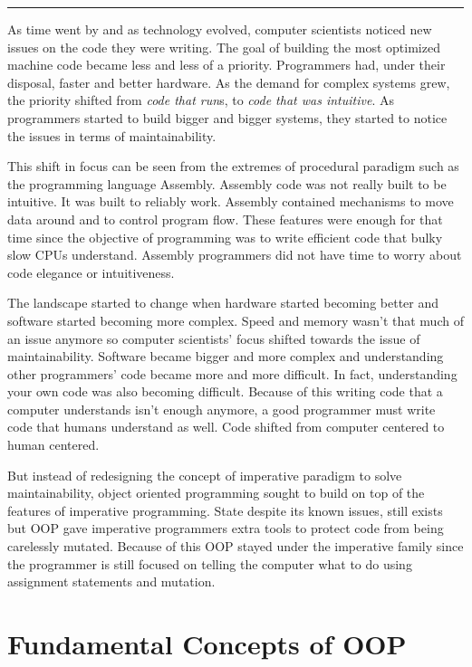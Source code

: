 \begin{center}\rule{0.5\linewidth}{0.5pt}\end{center}

As time went by and as technology evolved, computer scientists noticed
new issues on the code they were writing. The goal of building the most
optimized machine code became less and less of a priority. Programmers
had, under their disposal, faster and better hardware. As the demand for
complex systems grew, the priority shifted from \emph{code that run}s,
to \emph{code that was intuitive}. As programmers started to build
bigger and bigger systems, they started to notice the issues in terms of
maintainability.

This shift in focus can be seen from the extremes of procedural paradigm
such as the programming language Assembly. Assembly code was not really
built to be intuitive. It was built to reliably work. Assembly contained
mechanisms to move data around and to control program flow. These
features were enough for that time since the objective of programming
was to write efficient code that bulky slow CPUs understand. Assembly
programmers did not have time to worry about code elegance or
intuitiveness.

The landscape started to change when hardware started becoming better
and software started becoming more complex. Speed and memory wasn't that
much of an issue anymore so computer scientists' focus shifted towards
the issue of maintainability. Software became bigger and more complex
and understanding other programmers' code became more and more
difficult. In fact, understanding your own code was also becoming
difficult. Because of this writing code that a computer understands
isn't enough anymore, a good programmer must write code that humans
understand as well. Code shifted from computer centered to human
centered.

But instead of redesigning the concept of imperative paradigm to solve
maintainability, object oriented programming sought to build on top of
the features of imperative programming. State despite its known issues,
still exists but OOP gave imperative programmers extra tools to protect
code from being carelessly mutated. Because of this OOP stayed under the
imperative family since the programmer is still focused on telling the
computer what to do using assignment statements and mutation.

\section{Fundamental Concepts of
OOP}\label{object-oriented-programming-paradigm.md__fundamental-concepts-of-oop}

